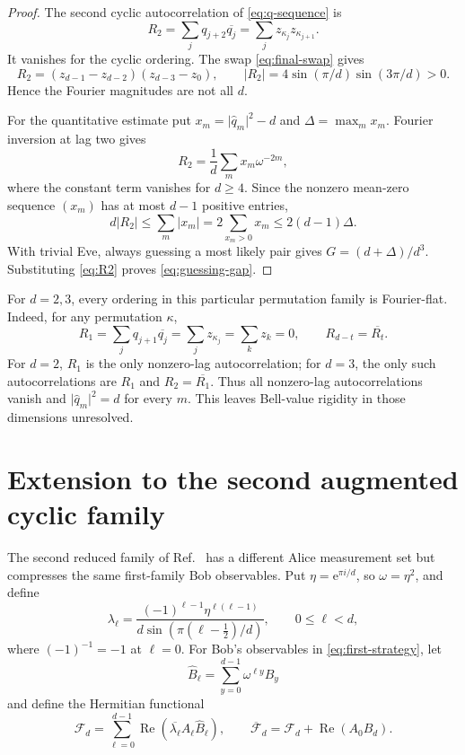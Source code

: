 \documentclass[11pt]{article}
\theoremstyle{definition}
\theoremstyle{remark}
\newcommand{\cF}{\mathcal F}
\newcommand{\Reop}{\operatorname{Re}}
\newcommand{\e}{\mathrm e}
\newcommand{\absop}[1]{\lvert #1\rvert}
\begin{document}
\begin{proof}
The second cyclic autocorrelation of \eqref{eq:q-sequence} is
\[
 R_2=\sum_jq_{j+2}\overline{q_j}
 =\sum_jz_{\kappa_j}z_{\kappa_{j+1}}.
\]
It vanishes for the cyclic ordering.  The swap \eqref{eq:final-swap} gives
\begin{equation}
 R_2=(z_{d-1}-z_{d-2})(z_{d-3}-z_0),
 \qquad
 \absop{R_2}=4\sin(\pi/d)\sin(3\pi/d)>0.
 \label{eq:R2}
\end{equation}
Hence the Fourier magnitudes are not all \(d\).

For the quantitative estimate put
\(x_m=\absop{\widehat q_m}^2-d\) and
\(\Delta=\max_mx_m\).  Fourier inversion at lag two gives
\[
 R_2=\frac1d\sum_mx_m\omega^{-2m},
\]
where the constant term vanishes for \(d\geq4\).  Since the nonzero
mean-zero sequence \((x_m)\) has at most \(d-1\) positive entries,
\[
 d\absop{R_2}\leq\sum_m\absop{x_m}
 =2\sum_{x_m>0}x_m\leq2(d-1)\Delta.
\]
With trivial Eve, always guessing a most likely pair gives
\(G=(d+\Delta)/d^3\).  Substituting \eqref{eq:R2} proves
\eqref{eq:guessing-gap}.
\end{proof}

For \(d=2,3\), every ordering in this particular permutation family is
Fourier-flat.  Indeed, for any permutation \(\kappa\),
\[
 R_1=\sum_jq_{j+1}\overline{q_j}
 =\sum_jz_{\kappa_j}=\sum_kz_k=0,
 \qquad R_{d-t}=\overline{R_t}.
\]
For \(d=2\), \(R_1\) is the only nonzero-lag autocorrelation; for \(d=3\),
the only such autocorrelations are \(R_1\) and
\(R_2=\overline{R_1}\).  Thus all nonzero-lag autocorrelations vanish and
\(\absop{\widehat q_m}^2=d\) for every \(m\).  This leaves Bell-value
rigidity in those dimensions unresolved.

\section{Extension to the second augmented cyclic family}
\label{sec:second}

The second reduced family of Ref.~\cite{PeritoEtAl2026} has a different
Alice measurement set but compresses the same first-family Bob observables.
Put \(\eta=\e^{\pi i/d}\), so \(\omega=\eta^2\), and define
\begin{equation}
 \lambda_\ell=
 \frac{(-1)^{\ell-1}\eta^{\ell(\ell-1)}}
 {d\sin(\pi(\ell-\tfrac12)/d)},
 \qquad 0\leq\ell<d,
 \label{eq:lambda}
\end{equation}
where \((-1)^{-1}=-1\) at \(\ell=0\).  For Bob's observables in
\eqref{eq:first-strategy}, let
\[
 \widehat B_\ell=\sum_{y=0}^{d-1}\omega^{\ell y}B_y
\]
and define the Hermitian functional
\begin{equation}
 \cF_d=\sum_{\ell=0}^{d-1}
 \Reop\!\left(\overline{\lambda_\ell}A_\ell\widehat B_\ell\right),
 \qquad
 \overline{\cF}_d=\cF_d+\Reop(A_0B_d).
 \label{eq:second-functional}
\end{equation}
\end{document}
